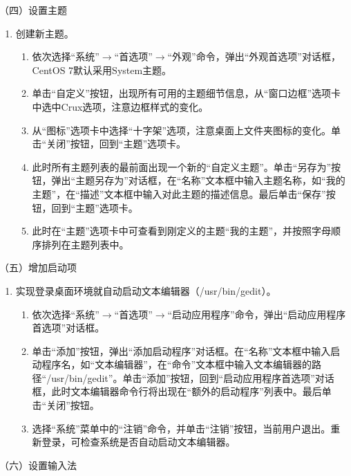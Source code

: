 \vspace{0.1in}
（四）设置主题
\begin{enumerate}
  \item 创建新主题。
    \begin{enumerate}
      \item 依次选择“系统”$\rightarrow$“首选项”$\rightarrow$“外观”命令，弹出“外观首选项”对话框，CentOS 7默认采用System主题。
      \item 单击“自定义”按钮，出现所有可用的主题细节信息，从“窗口边框”选项卡中选中Crux选项，注意边框样式的变化。
      \item 从“图标”选项卡中选择“十字架”选项，注意桌面上文件夹图标的变化。单击“关闭”按钮，回到“主题”选项卡。
      \item 此时所有主题列表的最前面出现一个新的“自定义主题”。单击“另存为”按钮，弹出“主题另存为”对话框，在“名称”文本框中输入主题名称，如“我的主题”，在“描述”文本框中输入对此主题的描述信息。最后单击“保存”按钮，回到“主题”选项卡。
      \item 此时在“主题”选项卡中可查看到刚定义的主题“我的主题”，并按照字母顺序排列在主题列表中。
    \end{enumerate}
\end{enumerate}

\vspace{0.1in}
（五）增加启动项
\begin{enumerate}
  \item 实现登录桌面环境就自动启动文本编辑器（/usr/bin/gedit）。
    \begin{enumerate}
      \item 依次选择“系统”$\rightarrow$“首选项”$\rightarrow$“启动应用程序”命令，弹出“启动应用程序首选项”对话框。
      \item 单击“添加”按钮，弹出“添加启动程序”对话框。在“名称”文本框中输入启动程序名，如“文本编辑器”，在“命令”文本框中输入文本编辑器的路径“/usr/bin/gedit”。单击“添加”按钮，回到“启动应用程序首选项”对话框，此时文本编辑器命令行将出现在“额外的启动程序”列表中。最后单击“关闭”按钮。
      \item 选择“系统”菜单中的“注销”命令，并单击“注销”按钮，当前用户退出。重新登录，可检查系统是否自动启动文本编辑器。
    \end{enumerate}
\end{enumerate}

\vspace{0.1in}
（六）设置输入法

